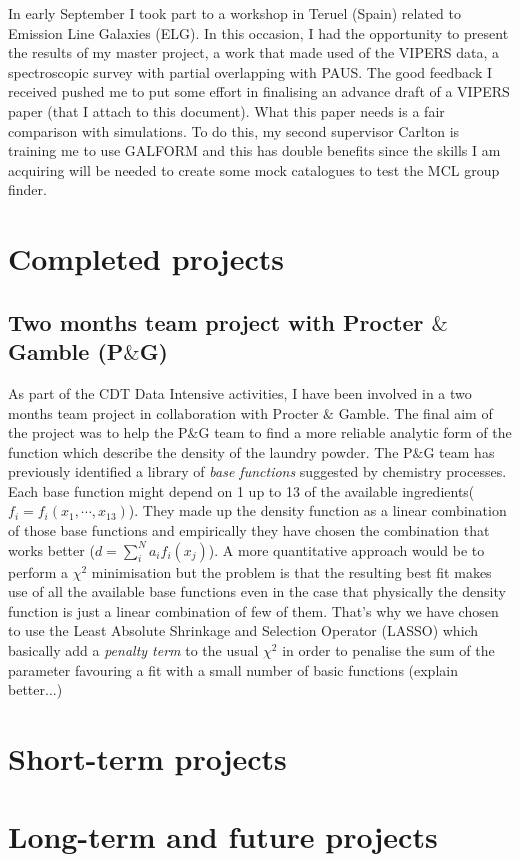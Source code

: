 \documentclass[letterpaper]{article}
\newcommand{\peg}{P$\&$G }
\begin{document}
In early September I took part to a workshop in Teruel (Spain) related to Emission Line Galaxies (ELG). In this occasion, I had the opportunity to present the results of my master project, a work that made used of the VIPERS data, a spectroscopic survey with partial overlapping with PAUS. The good feedback I received pushed me to put some effort in finalising an advance draft of a VIPERS paper (that I attach to this document). What this paper needs is a fair comparison with simulations. To do this, my second supervisor Carlton is training me to use GALFORM and this has double benefits since the skills I am acquiring will be needed to create some mock catalogues to test the MCL group finder.


\section{Completed projects}
\subsection{Two months team project with Procter $\&$ Gamble (P$\&$G)}

As part of the CDT Data Intensive activities, I have been involved in a two months team project in collaboration with Procter $\&$ Gamble. The final aim of the project was to help the P$\&$G team to find a more reliable analytic form of the function which describe the density of the laundry powder. The \peg team has previously identified a library of \textit{base functions} suggested by chemistry processes. Each base function might depend on 1 up to 13 of the available ingredients($f_i = f_i(x_1, \cdots, x_{13})$). They made up the density function as a linear combination of those base functions and empirically they have chosen the combination that works better ($d = \sum_i^N a_i f_i(x_j)$). A more quantitative approach would be to perform a $\chi^2$ minimisation but the problem is that the resulting best fit makes use of all the available base functions even in the case that physically the density function is just a linear combination of few of them. That's why we have chosen to use the Least Absolute Shrinkage and Selection Operator (LASSO) which basically add a \textit{penalty term} to the usual $\chi^2$ in order to penalise the sum of the parameter favouring a fit with a small number of basic functions (explain better...)




\section{Short-term projects}

\section{Long-term and future projects}


\end{document}
